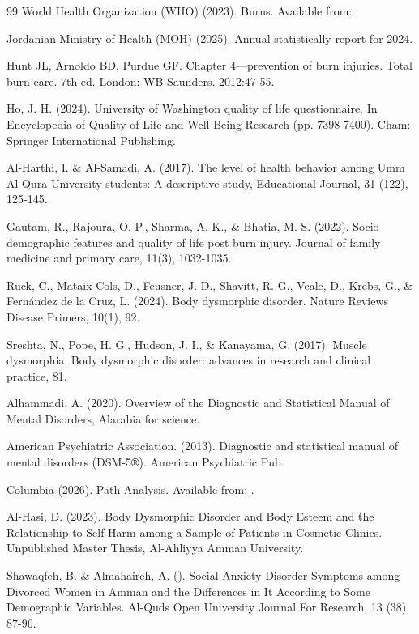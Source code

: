 \documentclass[10pt]{NSP1}
\begin{document}
\begin{thebibliography}{99}
World Health Organization (WHO) (2023). Burns. Available from:

Jordanian Ministry of Health (MOH) (2025). Annual statistically report for 2024.

Hunt JL, Arnoldo BD, Purdue GF. Chapter 4—prevention of burn injuries. Total burn care. 7th ed. London: WB Saunders. 2012:47‑55.

Ho, J. H. (2024). University of Washington quality of life questionnaire. In Encyclopedia of Quality of Life and Well-Being Research (pp. 7398-7400). Cham: Springer International Publishing.

Al-Harthi, I. \& Al-Samadi, A. (2017). The level of health behavior among Umm Al-Qura University students: A descriptive study, Educational Journal, 31 (122), 125-145.

Gautam, R., Rajoura, O. P., Sharma, A. K., \& Bhatia, M. S. (2022). Socio-demographic features and quality of life post burn injury. Journal of family medicine and primary care, 11(3), 1032-1035.

Rück, C., Mataix-Cols, D., Feusner, J. D., Shavitt, R. G., Veale, D., Krebs, G., \& Fernández de la Cruz, L. (2024). Body dysmorphic disorder. Nature Reviews Disease Primers, 10(1), 92.

Sreshta, N., Pope, H. G., Hudson, J. I., \& Kanayama, G. (2017). Muscle dysmorphia. Body dysmorphic disorder: advances in research and clinical practice, 81.

Alhammadi, A. (2020). Overview of the Diagnostic and Statistical Manual of Mental Disorders, Alarabia for science.

American Psychiatric Association. (2013). Diagnostic and statistical manual of mental disorders (DSM-5®). American Psychiatric Pub.

Columbia (2026). Path Analysis. Available from: .

Al-Hasi, D. (2023). Body Dysmorphic Disorder and Body Esteem and the Relationship to Self-Harm among a Sample of Patients in Cosmetic Clinics. Unpublished Master Thesis, Al-Ahliyya Amman University.

Shawaqfeh, B. \& Almahaireh, A. (). Social Anxiety Disorder Symptoms among Divorced Women in Amman and the Differences in It According to Some Demographic Variables. Al-Quds Open University Journal For Research, 13 (38), 87-96.


\end{thebibliography}
\end{document}

